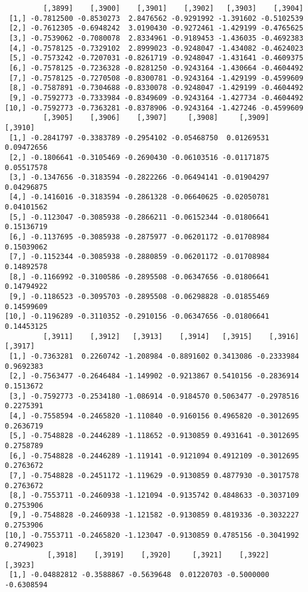 \documentclass[
  letterpaper,
  DIV=11,
  numbers=noendperiod]{scrreprt}
\begin{document}
\begin{verbatim}
         [,3899]    [,3900]    [,3901]    [,3902]   [,3903]    [,3904]
 [1,] -0.7812500 -0.8530273  2.8476562 -0.9291992 -1.391602 -0.5102539
 [2,] -0.7612305 -0.6948242  3.0190430 -0.9272461 -1.429199 -0.4765625
 [3,] -0.7539062 -0.7080078  2.8334961 -0.9189453 -1.436035 -0.4692383
 [4,] -0.7578125 -0.7329102  2.8999023 -0.9248047 -1.434082 -0.4624023
 [5,] -0.7573242 -0.7207031 -0.8261719 -0.9248047 -1.431641 -0.4609375
 [6,] -0.7578125 -0.7236328 -0.8281250 -0.9243164 -1.430664 -0.4604492
 [7,] -0.7578125 -0.7270508 -0.8300781 -0.9243164 -1.429199 -0.4599609
 [8,] -0.7587891 -0.7304688 -0.8330078 -0.9248047 -1.429199 -0.4604492
 [9,] -0.7592773 -0.7333984 -0.8349609 -0.9243164 -1.427734 -0.4604492
[10,] -0.7592773 -0.7363281 -0.8378906 -0.9243164 -1.427246 -0.4599609
         [,3905]    [,3906]    [,3907]     [,3908]     [,3909]    [,3910]
 [1,] -0.2841797 -0.3383789 -0.2954102 -0.05468750  0.01269531 0.09472656
 [2,] -0.1806641 -0.3105469 -0.2690430 -0.06103516 -0.01171875 0.05517578
 [3,] -0.1347656 -0.3183594 -0.2822266 -0.06494141 -0.01904297 0.04296875
 [4,] -0.1416016 -0.3183594 -0.2861328 -0.06640625 -0.02050781 0.04101562
 [5,] -0.1123047 -0.3085938 -0.2866211 -0.06152344 -0.01806641 0.15136719
 [6,] -0.1137695 -0.3085938 -0.2875977 -0.06201172 -0.01708984 0.15039062
 [7,] -0.1152344 -0.3085938 -0.2880859 -0.06201172 -0.01708984 0.14892578
 [8,] -0.1166992 -0.3100586 -0.2895508 -0.06347656 -0.01806641 0.14794922
 [9,] -0.1186523 -0.3095703 -0.2895508 -0.06298828 -0.01855469 0.14599609
[10,] -0.1196289 -0.3110352 -0.2910156 -0.06347656 -0.01806641 0.14453125
         [,3911]    [,3912]   [,3913]    [,3914]   [,3915]    [,3916]   [,3917]
 [1,] -0.7363281  0.2260742 -1.208984 -0.8891602 0.3413086 -0.2333984 0.9692383
 [2,] -0.7563477 -0.2646484 -1.149902 -0.9213867 0.5410156 -0.2836914 0.1513672
 [3,] -0.7592773 -0.2534180 -1.086914 -0.9184570 0.5063477 -0.2978516 0.2275391
 [4,] -0.7558594 -0.2465820 -1.110840 -0.9160156 0.4965820 -0.3012695 0.2636719
 [5,] -0.7548828 -0.2446289 -1.118652 -0.9130859 0.4931641 -0.3012695 0.2758789
 [6,] -0.7548828 -0.2446289 -1.119141 -0.9121094 0.4912109 -0.3012695 0.2763672
 [7,] -0.7548828 -0.2451172 -1.119629 -0.9130859 0.4877930 -0.3017578 0.2763672
 [8,] -0.7553711 -0.2460938 -1.121094 -0.9135742 0.4848633 -0.3037109 0.2753906
 [9,] -0.7548828 -0.2460938 -1.121582 -0.9130859 0.4819336 -0.3032227 0.2753906
[10,] -0.7553711 -0.2465820 -1.123047 -0.9130859 0.4785156 -0.3041992 0.2749023
          [,3918]    [,3919]    [,3920]     [,3921]    [,3922]    [,3923]
 [1,] -0.04882812 -0.3588867 -0.5639648  0.01220703 -0.5000000 -0.6308594

\end{verbatim}
\end{document}
